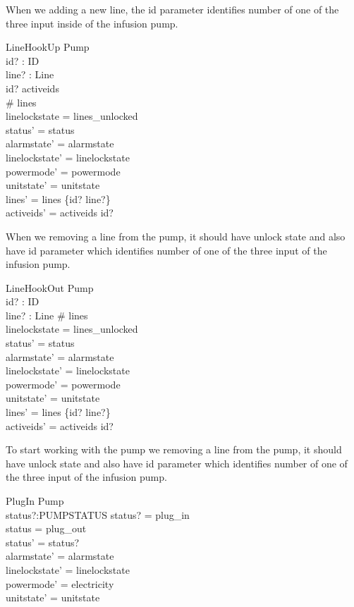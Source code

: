\documentclass{article}
\begin{document}
	When we adding a new line, the id parameter identifies number of 
	one of the three input inside of the infusion pump.

	\begin{schema}{LineHookUp}
		\Delta Pump \\
		id? : ID \\
		line? : Line \\
	\where
		id? \notin activeids\\
		\# lines  \\
		linelockstate = lines\_unlocked \\
		status' = status \\
		alarmstate' = alarmstate \\
		linelockstate' = linelockstate \\
		powermode' =  powermode \\
		unitstate' = unitstate \\
		lines' = lines \cup \{id? \mapsto line?\} \\
		activeids' = activeids \cup id?
	\end{schema}

	When we removing a line from the pump, it should have unlock state
	and also have id parameter which identifies number of one of the
	three input of the infusion pump.
	
	\begin{schema}{LineHookOut}
		\Delta Pump \\
		id? : ID \\
		line? : Line
	\where
		\# lines  \\
		linelockstate = lines_unlocked \\
		status' = status \\
		alarmstate' = alarmstate \\
		linelockstate' = linelockstate \\
		powermode' =  powermode \\
		unitstate' = unitstate \\
		lines' = lines \setminus \{id? \mapsto line?\} \\
		activeids' = activeids \setminus id?
	\end{schema}
	
	To start working with the pump we removing a line from the pump, it should have unlock state
	and also have id parameter which identifies number of one of the
	three input of the infusion pump.	
	
	\begin{schema}{PlugIn}
		\Delta Pump\\
		status?:PUMPSTATUS
	\where
		status? = plug\_in \\
		status = plug\_out \\
		status' = status? \\
		alarmstate' = alarmstate \\
		linelockstate' = linelockstate \\
		powermode' =  electricity \\
		unitstate' = unitstate \\
	\end{schema}
	
\end{document}
